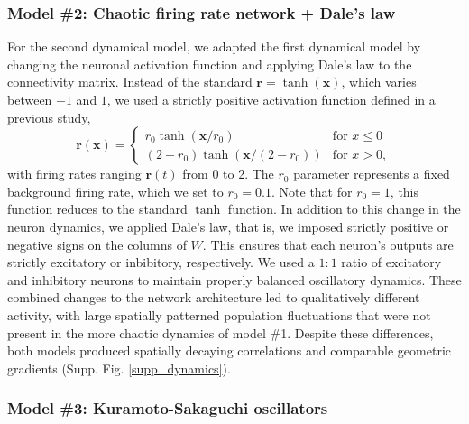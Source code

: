 \documentclass{article}
\begin{document}
\subsubsection*{Model \#2: Chaotic firing rate network + Dale's law}

For the second dynamical model, we adapted the first dynamical model by changing the neuronal activation function and applying Dale's law to the connectivity matrix. Instead of the standard $\textbf{r}=\tanh(\textbf{x})$, which varies between $-1$ and $1$, we used a strictly positive activation function defined in a previous study,
$$
\textbf{r}(\textbf{x})=
\begin{cases}
r_0\tanh(\textbf{x}/r_0) & \text{for } x\leq0\\
(2-r_0)\tanh(\textbf{x}/(2-r_0)) & \text{for } x>0,
\end{cases}
$$
with firing rates ranging $\textbf{r}(t)$ from 0 to 2. The $r_0$ parameter represents a fixed background firing rate, which we set to $r_0=0.1$. Note that for $r_0=1$, this function reduces to the standard $\tanh$ function. In addition to this change in the neuron dynamics, we applied Dale's law, that is, we imposed strictly positive or negative signs on the columns of $W$. This ensures that each neuron's outputs are strictly excitatory or inbibitory, respectively. We used a $1:1$ ratio of excitatory and inhibitory neurons to maintain properly balanced oscillatory dynamics. These combined changes to the network architecture led to qualitatively different activity, with large spatially patterned population fluctuations that were not present in the more chaotic dynamics of model \#1. Despite these differences, both models produced spatially decaying correlations and comparable geometric gradients (Supp. Fig. \ref{supp_dynamics}).

\subsubsection*{Model \#3: Kuramoto-Sakaguchi oscillators}
\end{document}
